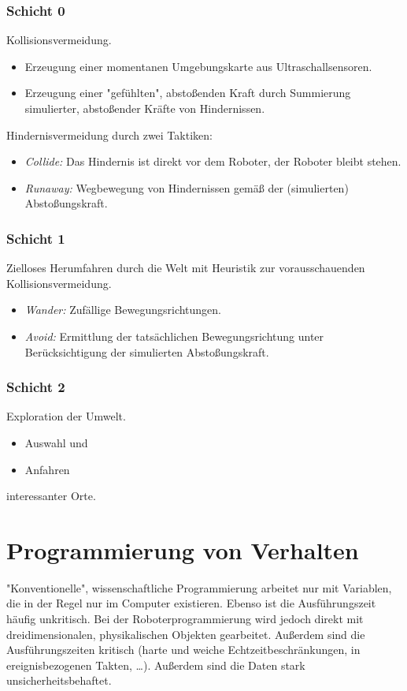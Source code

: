 			\subsubsection{Schicht 0}
				Kollisionsvermeidung.
					
				\begin{itemize}
					\item Erzeugung einer momentanen Umgebungskarte aus Ultraschallsensoren.
					\item Erzeugung einer "gefühlten", abstoßenden Kraft durch Summierung simulierter, abstoßender Kräfte von Hindernissen.
				\end{itemize}
				
				Hindernisvermeidung durch zwei Taktiken:
				\begin{itemize}
					\item \emph{Collide:} Das Hindernis ist direkt vor dem Roboter, der Roboter bleibt stehen.
					\item \emph{Runaway:} Wegbewegung von Hindernissen gemäß der (simulierten) Abstoßungskraft.
				\end{itemize}

			\subsubsection{Schicht 1}
				Zielloses Herumfahren durch die Welt mit Heuristik zur vorausschauenden Kollisionsvermeidung.
				
				\begin{itemize}
					\item \emph{Wander:} Zufällige Bewegungsrichtungen.
					\item \emph{Avoid:} Ermittlung der tatsächlichen Bewegungsrichtung unter Berücksichtigung der simulierten Abstoßungskraft.
				\end{itemize}

			\subsubsection{Schicht 2}
				Exploration der Umwelt.
				
				\begin{itemize}
					\item Auswahl und
					\item Anfahren
				\end{itemize}
				interessanter Orte.

	\section{Programmierung von Verhalten}
		"Konventionelle", wissenschaftliche Programmierung arbeitet nur mit Variablen, die in der Regel nur im Computer existieren. Ebenso ist die Ausführungszeit häufig unkritisch. Bei der Roboterprogrammierung wird jedoch direkt mit dreidimensionalen, physikalischen Objekten gearbeitet. Außerdem sind die Ausführungszeiten kritisch (harte und weiche Echtzeitbeschränkungen, in ereignisbezogenen Takten, \dots). Außerdem sind die Daten \iA stark unsicherheitsbehaftet.
		
